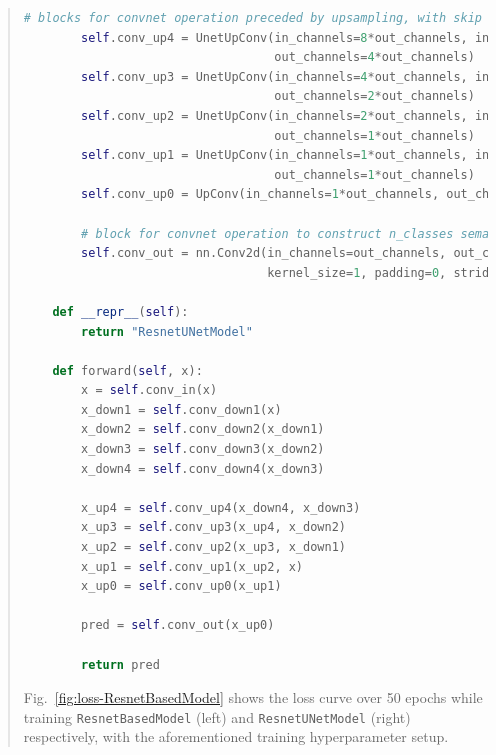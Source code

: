 \documentclass[9pt]{article}
\begin{document}
\begin{quote}
\begin{lstlisting}[language=Python, basicstyle=\scriptsize]
        # blocks for convnet operation preceded by upsampling, with skip connection
        self.conv_up4 = UnetUpConv(in_channels=8*out_channels, in_channels_skip=4*out_channels, 
                                   out_channels=4*out_channels)     
        self.conv_up3 = UnetUpConv(in_channels=4*out_channels, in_channels_skip=2*out_channels, 
                                   out_channels=2*out_channels)     
        self.conv_up2 = UnetUpConv(in_channels=2*out_channels, in_channels_skip=1*out_channels, 
                                   out_channels=1*out_channels)     
        self.conv_up1 = UnetUpConv(in_channels=1*out_channels, in_channels_skip=1*out_channels, 
                                   out_channels=1*out_channels)
        self.conv_up0 = UpConv(in_channels=1*out_channels, out_channels=1*out_channels)       

        # block for convnet operation to construct n_classes semantic outputs
        self.conv_out = nn.Conv2d(in_channels=out_channels, out_channels=n_classes, 
                                  kernel_size=1, padding=0, stride=1)
    
    def __repr__(self):
        return "ResnetUNetModel"        

    def forward(self, x):
        x = self.conv_in(x)
        x_down1 = self.conv_down1(x)
        x_down2 = self.conv_down2(x_down1)
        x_down3 = self.conv_down3(x_down2)
        x_down4 = self.conv_down4(x_down3)

        x_up4 = self.conv_up4(x_down4, x_down3)
        x_up3 = self.conv_up3(x_up4, x_down2)
        x_up2 = self.conv_up2(x_up3, x_down1)
        x_up1 = self.conv_up1(x_up2, x)
        x_up0 = self.conv_up0(x_up1)

        pred = self.conv_out(x_up0)

        return pred
\end{lstlisting}


Fig.~\ref{fig:loss-ResnetBasedModel} shows the loss curve over 50 epochs while training \texttt{ResnetBasedModel} (left) and \texttt{ResnetUNetModel} (right) respectively, with the aforementioned training hyperparameter setup. 


\end{quote}
\end{document}
